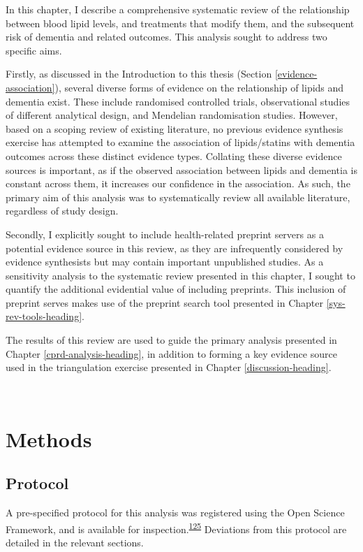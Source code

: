 \documentclass[a4paper, twoside]{templates/ociamthesis}
\begin{document}
In this chapter, I describe a comprehensive systematic review of the relationship between blood lipid levels, and treatments that modify them, and the subsequent risk of dementia and related outcomes. This analysis sought to address two specific aims.

Firstly, as discussed in the Introduction to this thesis (Section \ref{evidence-association}), several diverse forms of evidence on the relationship of lipids and dementia exist. These include randomised controlled trials, observational studies of different analytical design, and Mendelian randomisation studies. However, based on a scoping review of existing literature, no previous evidence synthesis exercise has attempted to examine the association of lipids/statins with dementia outcomes across these distinct evidence types. Collating these diverse evidence sources is important, as if the observed association between lipids and dementia is constant across them, it increases our confidence in the association. As such, the primary aim of this analysis was to systematically review all available literature, regardless of study design.

Secondly, I explicitly sought to include health-related preprint servers as a potential evidence source in this review, as they are infrequently considered by evidence synthesists but may contain important unpublished studies. As a sensitivity analysis to the systematic review presented in this chapter, I sought to quantify the additional evidential value of including preprints. This inclusion of preprint serves makes use of the preprint search tool presented in Chapter \ref{sys-rev-tools-heading}.

The results of this review are used to guide the primary analysis presented in Chapter \ref{cprd-analysis-heading}, in addition to forming a key evidence source used in the triangulation exercise presented in Chapter \ref{discussion-heading}.

~

\hypertarget{methods}{%
\section{Methods}\label{methods}}

\hypertarget{protocol}{%
\subsection{Protocol}\label{protocol}}

A pre-specified protocol for this analysis was registered using the Open Science Framework, and is available for inspection.\textsuperscript{\protect\hyperlink{ref-mcguinnessluke2020}{125}} Deviations from this protocol are detailed in the relevant sections.
\end{document}
